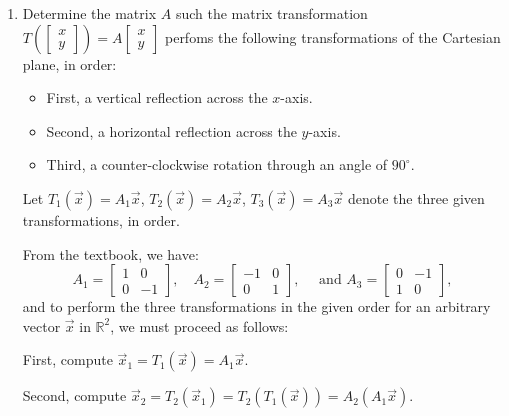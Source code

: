 \documentclass[letterpaper,12pt]{amsart}
\newcommand{\R}{\mathbb{R}}
\newcommand{\bbm}{\begin{bmatrix}}
\newcommand{\ebm}{\end{bmatrix}}
\begin{document}
\begin{enumerate}
\begin{enumerate}
\bigskip

 \item Show that if $A$ is an $n\times n$ idempotent matirx and $B$ is any other $n\times n$ matrix, then
\[
 C = A+BA-ABA
\]
 is an idempotent matrix.

\bigskip

We have
\begin{align*}
 C^2 & = (A+BA-ABA)(A+BA-ABA)\\
 & = A(A)+ABA-A(ABA)+(BA)(A)+(BA)(BA)-(BA)(ABA)-(ABA)(A)-(ABA)(BA)+(ABA)(ABA)\\
 & = A^2 + ABA-A^2(BA)+B(A^2)+BABA-B(A^2)(BA)-AB(A^2)-ABABA+AB(A^2)(BA)\\
 & = A + (ABA-ABA)+BA+(BABA-BABA)-ABA+(-ABABA+ABABA)\\
 & = A+BA-ABA,
\end{align*}
as required.
 \end{enumerate}

\bigskip

 \item Determine the matrix $A$ such the matrix transformation $T\left(\bbm x\\y\ebm\right) = A\bbm x\\y\ebm$ perfoms the following transformations of the Cartesian plane, in order:
\begin{itemize}
 \item First, a vertical reflection across the $x$-axis.
 \item Second, a horizontal reflection across the $y$-axis.
 \item Third, a counter-clockwise rotation through an angle of $90^\circ$.
\end{itemize}

\bigskip

Let $T_1(\vec{x})=A_1\vec{x}$, $T_2(\vec{x})=A_2\vec{x}$, $T_3(\vec{x})=A_3\vec{x}$ denote the three given transformations, in order.

From the textbook, we have:
\[
 A_1 = \bbm 1&0\\0&-1\ebm,\quad A_2 = \bbm -1&0\\0&1\ebm, \quad \text{ and } A_3 = \bbm 0&-1\\1&0\ebm,
\]
and to perform the three transformations in the given order for an arbitrary vector $\vec{x}$ in $\R^2$, we must proceed as follows:

First, compute $\vec{x}_1 = T_1(\vec{x}) = A_1\vec{x}$.

Second, compute $\vec{x}_2 = T_2(\vec{x}_1) = T_2(T_1(\vec{x})) = A_2(A_1\vec{x})$.


\end{enumerate}
\end{document}
